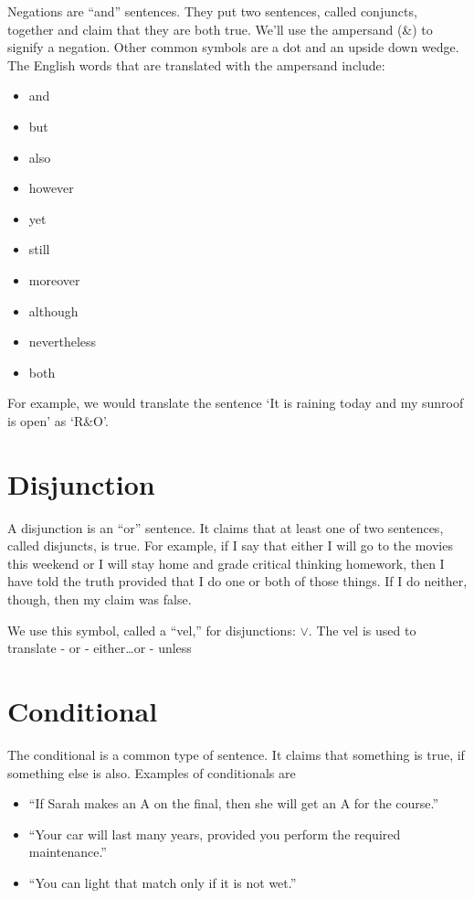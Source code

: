 Negations are ``and'' sentences. They put two sentences, called conjuncts, together and claim that they are both true. We'll use the ampersand (\&) to signify a negation. Other common symbols are a dot and an upside down wedge. The English words that are translated with the ampersand include:

\begin{itemize}
\item
  and
\item
  but
\item
  also
\item
  however
\item
  yet
\item
  still
\item
  moreover
\item
  although
\item
  nevertheless
\item
  both
\end{itemize}

For example, we would translate the sentence `It is raining today and my sunroof is open' as `\(\textrm{R} \& \textrm{O}\)'.

\section{Disjunction}\label{disjunction}

A disjunction is an ``or'' sentence. It claims that at least one of two sentences, called disjuncts, is true. For example, if I say that either I will go to the movies this weekend or I will stay home and grade critical thinking homework, then I have told the truth provided that I do one or both of those things. If I do neither, though, then my claim was false.

We use this symbol, called a ``vel,'' for disjunctions: \(\vee\). The vel is used to translate
- or
- either\dots or
- unless

\section{Conditional}\label{conditional}

The conditional is a common type of sentence. It claims that something is true, if something else is also. Examples of conditionals are

\begin{itemize}
\item
  ``If Sarah makes an A on the final, then she will get an A for the course.''
\item
  ``Your car will last many years, provided you perform the required maintenance.''
\item
  ``You can light that match only if it is not wet.''
\end{itemize}

